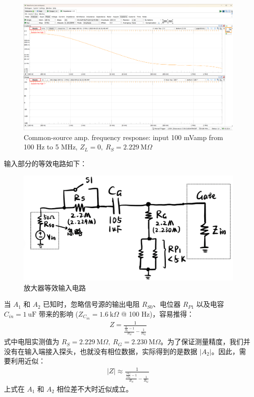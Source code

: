 \documentclass[UTF8]{article}
\begin{document}
\begin{figure}[H]\centering
    \includegraphics[width=\columnwidth]{LCE-04-场效应管/assets/cs amp/cs amp input impedance, R_S = 2M229 (input 100 mVamp, 100Hz ~ 5MHz).png}
    \caption{Common-source amp. frequency response: input 100 mVamp from 100 Hz to 5 MHz, $Z_L = 0,\ R_S = 2.229 \ \mathrm{M}\Omega$}
\end{figure}

输入部分的等效电路如下：
\begin{figure}[H]\centering
    \includegraphics[width=0.6\columnwidth]{LCE-04-场效应管/assets/cs amp/input.png}
    \caption{放大器等效输入电路}
\end{figure}
当 $A_1$ 和 $A_2$ 已知时，忽略信号源的输出电阻 $R_{S0}$、电位器 $R_{P1}$ 以及电容 $C_{in} = 1 \ \mathrm{uF}$ 带来的影响 ($Z_{C_{in}} = 1.6 \ \mathrm{k}\Omega$ @ 100 Hz)，容易推得：
\begin{gather}
Z = \frac{1}{\frac{\frac{A_1}{A_2} - 1}{R_S} - \frac{1}{R_G}}
\end{gather}
式中电阻实测值为 $R_S = 2.229 \ \mathrm{M}\Omega,\ R_G = 2.230 \ \mathrm{M}\Omega$。为了保证测量精度，我们并没有在输入端接入探头，也就没有相位数据，实际得到的是数据 $|A_2|$。因此，需要利用近似：
\begin{gather}
\label{eq: Z_in}
|Z|\approx  \frac{1}{\frac{\frac{|A_1|}{|A_2|} - 1}{R_S} - \frac{1}{R_G}}
\end{gather}
上式在 $A_1$ 和 $A_2$ 相位差不大时近似成立。
\end{document}
